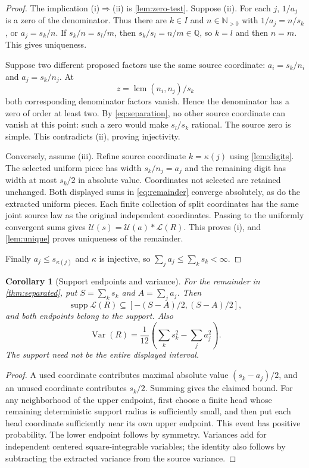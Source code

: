 \documentclass[11pt,letterpaper]{article}
\newtheorem{corollary}[theorem]{Corollary}
\theoremstyle{definition}
\theoremstyle{remark}
\newcommand{\Np}{\mathbb N_{>0}}
\newcommand{\Q}{\mathbb Q}
\newcommand{\Law}{\mathcal L}
\newcommand{\Un}{\mathcal U}
\newcommand{\supp}{\operatorname{supp}}
\newcommand{\lcm}{\operatorname{lcm}}
\numberwithin{equation}{section}
\begin{document}
\begin{proof}
The implication (i)$\Rightarrow$(ii) is \cref{lem:zero-test}. Suppose (ii). For each $j$, $1/a_j$ is a zero of the denominator. Thus there are $k\in I$ and $n\in\Np$ with $1/a_j=n/s_k$, or $a_j=s_k/n$. If $s_k/n=s_l/m$, then $s_k/s_l=n/m\in\Q$, so $k=l$ and then $n=m$. This gives uniqueness.

Suppose two different proposed factors use the same source coordinate: $a_i=s_k/n_i$ and $a_j=s_k/n_j$. At
\[
 z=\lcm(n_i,n_j)/s_k
\]
both corresponding denominator factors vanish. Hence the denominator has a zero of order at least two. By \eqref{eq:separation}, no other source coordinate can vanish at this point: such a zero would make $s_l/s_k$ rational. The source zero is simple. This contradicts (ii), proving injectivity.

Conversely, assume (iii). Refine source coordinate $k=\kappa(j)$ using \cref{lem:digits}. The selected uniform piece has width $s_k/n_j=a_j$ and the remaining digit has width at most $s_k/2$ in absolute value. Coordinates not selected are retained unchanged. Both displayed sums in \eqref{eq:remainder} converge absolutely, as do the extracted uniform pieces. Each finite collection of split coordinates has the same joint source law as the original independent coordinates. Passing to the uniformly convergent sums gives
$\Un(s)=\Un(a)*\Law(R)$. This proves (i), and \cref{lem:unique} proves uniqueness of the remainder.

Finally $a_j\le s_{\kappa(j)}$ and $\kappa$ is injective, so $\sum_j a_j\le\sum_k s_k<\infty$.
\end{proof}

\begin{corollary}[Support endpoints and variance]\label{cor:support}
For the remainder in \cref{thm:separated}, put $S=\sum_ks_k$ and $A=\sum_ja_j$. Then
\[
 \supp\Law(R)\subseteq[-(S-A)/2,(S-A)/2],
\]
and both endpoints belong to the support. Also
\[
 \operatorname{Var}(R)=\frac1{12}\left(\sum_ks_k^2-\sum_ja_j^2\right).
\]
The support need not be the entire displayed interval.
\end{corollary}
\begin{proof}
A used coordinate contributes maximal absolute value $(s_k-a_j)/2$, and an unused coordinate contributes $s_k/2$. Summing gives the claimed bound. For any neighborhood of the upper endpoint, first choose a finite head whose remaining deterministic support radius is sufficiently small, and then put each head coordinate sufficiently near its own upper endpoint. This event has positive probability. The lower endpoint follows by symmetry. Variances add for independent centered square-integrable variables; the identity also follows by subtracting the extracted variance from the source variance.
\end{proof}
\end{document}
